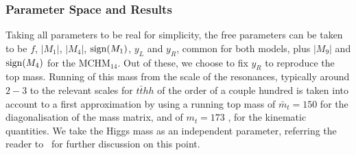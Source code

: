 \subsubsection*{Parameter Space and Results}
\label{analysis}
Taking all parameters to be real for simplicity, the free parameters can be taken to be $f$, $|M_1|$, $|M_4|$, ${\rm sign}(M_1)$, $y_L$ and $y_R$, common for both models, plus $|M_9|$ and ${\rm sign}(M_4)$ for the MCHM$_{14}$.
Out of these, we choose to fix $y_R$ to reproduce the top mass. Running of this mass from the scale of the resonances, typically around $2-3$ \UTeV to the relevant scales for $t\bar{t}hh$ of the order of a
couple hundred \UGeV is taken into account to a first approximation by using a running top mass of $\bar{m}_t = 150$ \UGeV for the diagonalisation of the mass
matrix, and of $m_t = 173$ \UGeV, for the kinematic quantities.   We take the Higgs mass as an independent parameter,
referring the reader to~\cite{MCHMtthh} for further discussion on this point.

